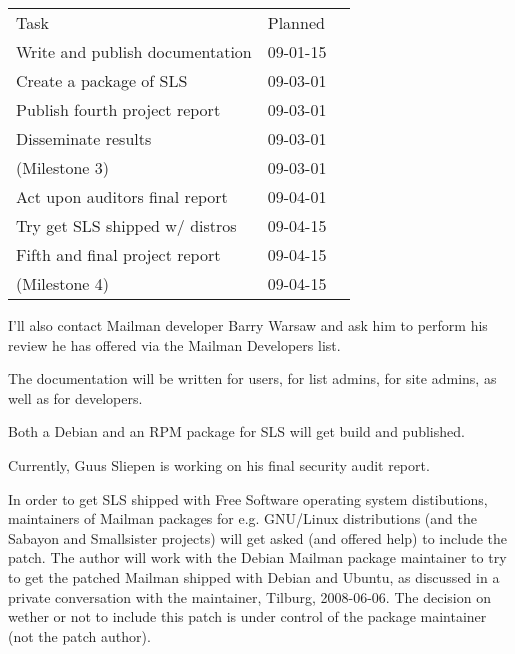 \documentclass[a4]{article}
\begin{document}
\begin{tabular}{lll}
 Task                            & Planned  \\ \cline{1-2}
 Write and publish documentation & 09-01-15 \\
 Create a package of SLS         & 09-03-01 \\
 Publish fourth project report   & 09-03-01 \\
 Disseminate results             & 09-03-01 \\
 (Milestone 3)                   & 09-03-01 \\
 Act upon auditors final report  & 09-04-01 \\
 Try get SLS shipped w/ distros  & 09-04-15 \\
 Fifth and final project report  & 09-04-15 \\
 (Milestone 4)                   & 09-04-15 \\
\end{tabular}

I'll also contact Mailman developer Barry Warsaw and ask him to perform his
review he has offered via the Mailman Developers list.

The documentation will be written for users, for list admins, for site admins,
as well as for developers.

Both a Debian and an RPM package for SLS will get build and published.

Currently, Guus Sliepen is working on his final security audit report.

In order to get SLS shipped with Free Software operating system distibutions,
maintainers of Mailman packages for e.g. GNU/Linux distributions (and the
Sabayon and Smallsister projects) will get asked (and offered help) to include
the patch.  The author will work with the Debian Mailman package maintainer to
try to get the patched Mailman shipped with Debian and Ubuntu, as discussed in
a private conversation with the maintainer, Tilburg, 2008-06-06.  The decision
on wether or not to include this patch is under control of the package
maintainer (not the patch author).
\end{document}
